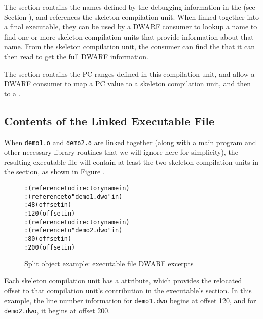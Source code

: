 The \dotdebugnames{}
section contains the names defined by the debugging
information in the \splitDWARFobjectfile{} 
(see Section ), 
and references the skeleton compilation unit. 
When linked together into a final executable,
they can be used by a DWARF consumer to lookup a name to find one
or more skeleton compilation units that provide information about
that name. From the skeleton compilation unit, the consumer can
find the \splitDWARFobjectfile{} that it can then read to get the full
DWARF information.

The \dotdebugaranges{} section contains the PC ranges defined in this
compilation unit, and allow a DWARF consumer to map a PC value to
a skeleton compilation unit, and then to a \splitDWARFobjectfile.


\subsection{Contents of the Linked Executable File}
When \texttt{demo1.o} and \texttt{demo2.o} are linked together (along with 
a main program and other necessary library routines that we will ignore here
for simplicity), the resulting executable file will contain at least
the two skeleton compilation units in the \dotdebuginfo{} section, as shown in 
Figure .

\begin{figure}[ht]
\begin{dwflisting}
\begin{alltt}

    \DWTAGskeletonunit
        \DWATcompdir: (reference to directory name in \dotdebugstr)
        \DWATdwoname: (reference to "demo1.dwo" in \dotdebugstr)
        \DWATaddrbase: 48 (offset in \dotdebugaddr)
        \DWATstmtlist: 120 (offset in \dotdebugline)
    \DWTAGskeletonunit
        \DWATcompdir: (reference to directory name in \dotdebugstr)
        \DWATdwoname: (reference to "demo2.dwo" in \dotdebugstr)
        \DWATaddrbase: 80 (offset in \dotdebugaddr)
        \DWATstmtlist: 200 (offset in \dotdebugline)

\end{alltt}
\end{dwflisting}
\caption{Split object example: executable file DWARF excerpts}
\label{fig:splitobjectexampleexecutablefiledwarfexcerpts}
\end{figure}

Each skeleton compilation unit has a \DWATstmtlist{} attribute,
which provides the relocated offset to that compilation unit's
contribution in the executable's \dotdebugline{} section. In this
example, the line number information for \texttt{demo1.dwo} begins at
offset 120, and for \texttt{demo2.dwo}, it begins at offset 200.


